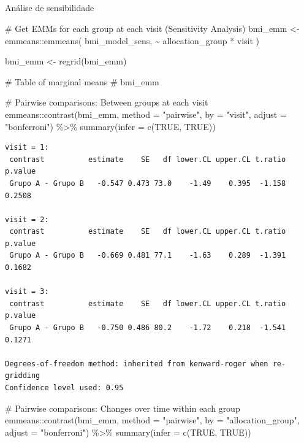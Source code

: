 \documentclass[
  12pt,
]{article}
\makeatletter
\let\oldsubparagraph\subparagraph
\renewcommand{\subparagraph}{
    \@ifstar
      \xxxSubParagraphStar
      \xxxSubParagraphNoStar
  }
\newcommand{\xxxSubParagraphStar}[1]{\oldsubparagraph*{#1}\mbox{}}
\newcommand{\xxxSubParagraphNoStar}[1]{\oldsubparagraph{#1}\mbox{}}
\newenvironment{Shaded}{\begin{snugshade}}{\end{snugshade}}
\newcommand{\AttributeTok}[1]{\textcolor[rgb]{0.40,0.45,0.13}{#1}}
\newcommand{\CommentTok}[1]{\textcolor[rgb]{0.37,0.37,0.37}{#1}}
\newcommand{\ConstantTok}[1]{\textcolor[rgb]{0.56,0.35,0.01}{#1}}
\newcommand{\FunctionTok}[1]{\textcolor[rgb]{0.28,0.35,0.67}{#1}}
\newcommand{\NormalTok}[1]{\textcolor[rgb]{0.00,0.23,0.31}{#1}}
\newcommand{\OtherTok}[1]{\textcolor[rgb]{0.00,0.23,0.31}{#1}}
\newcommand{\SpecialCharTok}[1]{\textcolor[rgb]{0.37,0.37,0.37}{#1}}
\newcommand{\StringTok}[1]{\textcolor[rgb]{0.13,0.47,0.30}{#1}}
\makeatother
\begin{document}
\subparagraph{Análise de
sensibilidade}\label{anuxe1lise-de-sensibilidade-14}

\begin{Shaded}
\begin{Highlighting}[]
\CommentTok{\# Get EMMs for each group at each visit (Sensitivity Analysis)}
\NormalTok{bmi\_emm }\OtherTok{\textless{}{-}}\NormalTok{ emmeans}\SpecialCharTok{::}\FunctionTok{emmeans}\NormalTok{(}
\NormalTok{    bmi\_model\_sens, }
    \SpecialCharTok{\textasciitilde{}}\NormalTok{ allocation\_group }\SpecialCharTok{*}\NormalTok{ visit}
\NormalTok{)}

\NormalTok{bmi\_emm }\OtherTok{\textless{}{-}} \FunctionTok{regrid}\NormalTok{(bmi\_emm)}

\CommentTok{\# Table of marginal means}
\CommentTok{\# bmi\_emm}

\CommentTok{\# Pairwise comparisons: Between groups at each visit}
\NormalTok{emmeans}\SpecialCharTok{::}\FunctionTok{contrast}\NormalTok{(bmi\_emm,}
\AttributeTok{method =} \StringTok{"pairwise"}\NormalTok{, }\AttributeTok{by =} \StringTok{"visit"}\NormalTok{,}
\AttributeTok{adjust =} \StringTok{"bonferroni"}\NormalTok{) }\SpecialCharTok{\%\textgreater{}\%} \FunctionTok{summary}\NormalTok{(}\AttributeTok{infer =} \FunctionTok{c}\NormalTok{(}\ConstantTok{TRUE}\NormalTok{, }\ConstantTok{TRUE}\NormalTok{))}
\end{Highlighting}
\end{Shaded}

\begin{verbatim}
visit = 1:
 contrast          estimate    SE   df lower.CL upper.CL t.ratio p.value
 Grupo A - Grupo B   -0.547 0.473 73.0    -1.49    0.395  -1.158  0.2508

visit = 2:
 contrast          estimate    SE   df lower.CL upper.CL t.ratio p.value
 Grupo A - Grupo B   -0.669 0.481 77.1    -1.63    0.289  -1.391  0.1682

visit = 3:
 contrast          estimate    SE   df lower.CL upper.CL t.ratio p.value
 Grupo A - Grupo B   -0.750 0.486 80.2    -1.72    0.218  -1.541  0.1271

Degrees-of-freedom method: inherited from kenward-roger when re-gridding 
Confidence level used: 0.95 
\end{verbatim}

\begin{Shaded}
\begin{Highlighting}[]
\CommentTok{\# Pairwise comparisons: Changes over time within each group}
\NormalTok{emmeans}\SpecialCharTok{::}\FunctionTok{contrast}\NormalTok{(bmi\_emm,}
\AttributeTok{method =} \StringTok{"pairwise"}\NormalTok{, }\AttributeTok{by =} \StringTok{"allocation\_group"}\NormalTok{,}
\AttributeTok{adjust =} \StringTok{"bonferroni"}\NormalTok{) }\SpecialCharTok{\%\textgreater{}\%} \FunctionTok{summary}\NormalTok{(}\AttributeTok{infer =} \FunctionTok{c}\NormalTok{(}\ConstantTok{TRUE}\NormalTok{, }\ConstantTok{TRUE}\NormalTok{))}
\end{Highlighting}
\end{Shaded}
\end{document}
